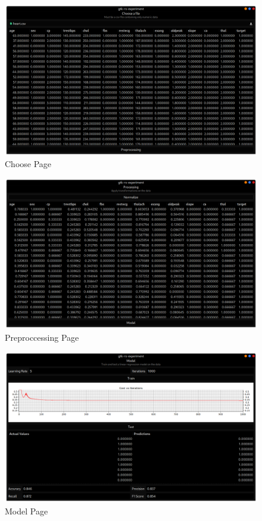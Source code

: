 \documentclass[12pt, a4]{article}
\begin{document}
\begin{figure}[h]
\centering
\includegraphics[width=120mm]{choose}
\caption{Choose Page}
\label{fig:choose}
\end{figure}


\begin{figure}[h]
\centering
\includegraphics[width=120mm]{preprocessing}
\caption{Preproccessing Page}
\label{fig:preprocessing}
\end{figure}

\begin{figure}[h]
\centering
\includegraphics[width=120mm]{model}
\caption{Model Page}
\label{fig:model}
\end{figure}
\end{document}
